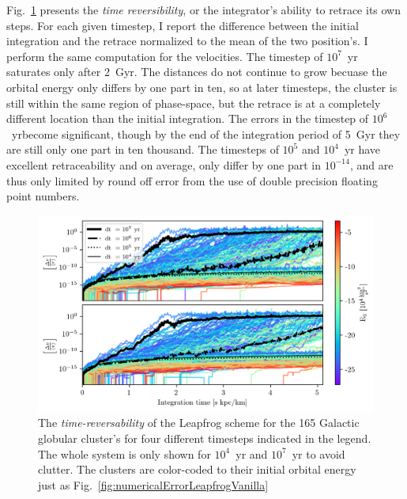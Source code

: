         Fig.~\ref{fig:numericalErrorReverseIntegration} presents the \textit{time reversibility}, or the integrator's ability to retrace its own steps. For each given timestep, I report the difference between the initial integration and the retrace normalized to the mean of the two position's. I perform the same computation for the velocities. The timestep of $10^7$~yr saturates only after 2~Gyr. The distances do not continue to grow becuase the orbital energy only differs by one part in ten, so at later timesteps, the cluster is still within the same region of phase-space, but the retrace is at a completely different location than the initial integration. The errors in the timestep of $10^6$~yrbecome significant, though by the end of the integration period of 5~Gyr they are still only one part in ten thousand. The timesteps of $10^5$ and $10^4$~yr have excellent retraceability and on average, only differ by one part in $10^{-14}$, and are thus only limited by round off error from the use of double precision floating point numbers.
        \begin{figure}
            \centering
            \includegraphics[width=\linewidth]{images/numericalErrorReverseIntegration.png}
            \caption{The \textit{time-reversability} of the Leapfrog scheme for the 165 Galactic globular cluster's for four different timesteps indicated in the legend. The whole system is only shown for $10^4$~yr and $10^7$~yr to avoid clutter. The clusters are color-coded to their initial orbital energy just as Fig.~\ref{fig:numericalErrorLeapfrogVanilla}}
            \label{fig:numericalErrorReverseIntegration}
        \end{figure}


